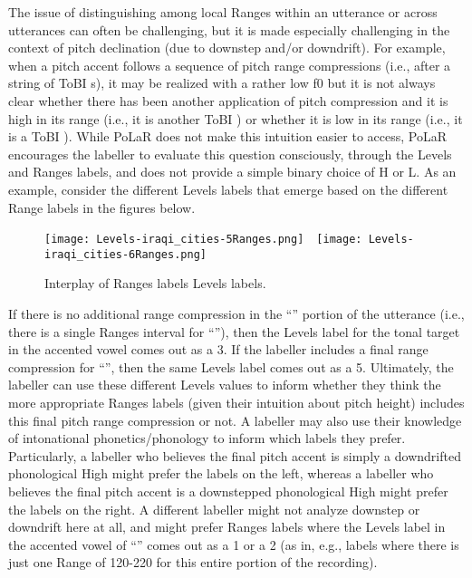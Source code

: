 The issue of distinguishing among local Ranges within an utterance or across utterances can often be challenging, but it is made especially challenging in the context of pitch declination (due to downstep and/or downdrift). For example, when a pitch accent follows a sequence of pitch range compressions (i.e., after a string of ToBI s), it may be realized with a rather low f0 but it is not always clear whether there has been another application of pitch compression and it is high in its range (i.e., it is another ToBI ) or whether it is low in its range (i.e., it is a ToBI ). While PoLaR does not make this intuition easier to access, PoLaR encourages the labeller to evaluate this question consciously, through the Levels and Ranges labels, and does not provide a simple binary choice of H or L.  As an example, consider the different Levels labels that emerge based on the different Range labels in the figures below.

\begin{figure}[H]
\centering
%
\texttt{[image: Levels-iraqi\_cities-5Ranges.png]}~~\texttt{[image: Levels-iraqi\_cities-6Ranges.png]}
%
\caption{Interplay of Ranges labels Levels labels.%
\label{fig:iraqi_cities Levels Adv}%
}
\end{figure}

If there is no additional range compression in the “” portion of the utterance (i.e., there is a single Ranges interval for “”), then the Levels label for the tonal target in the accented vowel comes out as a 3. If the labeller includes a final range compression for “”, then the same Levels label comes out as a 5. Ultimately, the labeller can use these different Levels values to inform whether they think the more appropriate Ranges labels (given their intuition about pitch height) includes this final pitch range compression or not. A labeller may also use their knowledge of intonational phonetics\slash phonology to inform which labels they prefer. Particularly, a labeller who believes the final pitch accent is simply a downdrifted phonological High might prefer the labels on the left, whereas a labeller who believes the final pitch accent is a downstepped phonological High might prefer the labels on the right. A different labeller might not analyze downstep or downdrift here at all, and might prefer Ranges labels where the Levels label in the accented vowel of “” comes out as a 1 or a 2 (as in, e.g., labels where there is just one Range of 120-220 for this entire portion of the recording).

